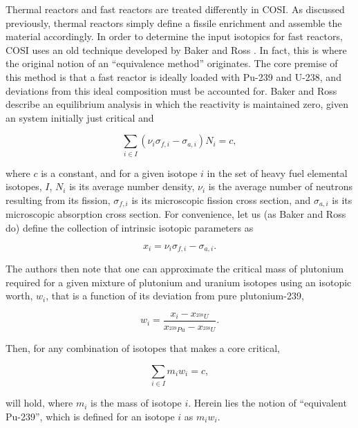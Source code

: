 Thermal reactors and fast reactors are treated differently in COSI. As discussed
previously, thermal reactors simply define a fissile enrichment and assemble the
material accordingly. In order to determine the input isotopics for fast
reactors, COSI uses an old technique developed by Baker and Ross
\cite{baker_comparison_1963}. In fact, this is where the original notion of an
``equivalence method'' originates. The core premise of this method is that a
fast reactor is ideally loaded with Pu-239 and U-238, and deviations from this
ideal composition must be accounted for. Baker and Ross describe an equilibrium
analysis in which the reactivity is maintained zero, given an system initially
just critical and

\begin{equation*}
\sum_{i \in I} \left( \nu_{i} \sigma_{f,i} - \sigma_{a,i} \right) N_i = c,
\end{equation*}

where $c$ is a constant, and for a given isotope $i$ in the set of heavy fuel
elemental isotopes, $I$, $N_i$ is its average number density, $\nu_{i}$ is the
average number of neutrons resulting from its fission, $\sigma_{f,i}$ is its
microscopic fission cross section, and $\sigma_{a,i}$ is its microscopic
absorption cross section. For convenience, let us (as Baker and Ross do) define
the collection of intrinsic isotopic parameters as

\begin{equation*}
x_i = \nu_{i} \sigma_{f,i} - \sigma_{a,i}.
\end{equation*}

The authors then note that one can approximate the critical mass of plutonium
required for a given mixture of plutonium and uranium isotopes using an isotopic
worth, $w_i$, that is a function of its deviation from pure plutonium-239,

\begin{equation*}
w_i = \frac{x_i - x_{^{238}U}}
           {x_{^{239}Pu} - x_{^{238}U}}.
\end{equation*}

Then, for any combination of isotopes that makes a core critical, 

\begin{equation*}
\sum_{i \in I} m_i w_i = c,
\end{equation*}

will hold, where $m_i$ is the mass of isotope $i$. Herein lies the notion of
``equivalent Pu-239'', which is defined for an isotope $i$ as $m_i w_i$.

